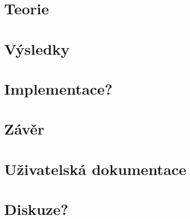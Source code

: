 \documentclass[a4]{article}
\begin{document}
\section{Teorie}
\section{Výsledky}
\section{Implementace?}%
\section{Závěr}
\section{Uživatelská dokumentace}
\section{Diskuze?}
\end{document}
